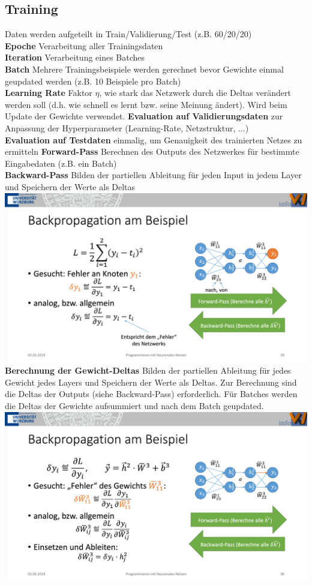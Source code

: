 \documentclass[12pt]{article}
\begin{document}
	\subsection{Training}
	Daten werden aufgeteilt in Train/Validierung/Test (z.B. 60/20/20)\\
	\textbf{Epoche} Verarbeitung aller Trainingsdaten\\
	\textbf{Iteration} Verarbeitung eines Batches\\
	\textbf{Batch} Mehrere Trainingsbeispiele werden gerechnet bevor Gewichte einmal geupdated werden (z.B. 10 Beispiele pro Batch)\\
	\textbf{Learning Rate} Faktor $\eta$, wie stark das Netzwerk durch die Deltas verändert werden soll (d.h. wie schnell es lernt bzw. seine Meinung ändert). Wird beim Update der Gewichte verwendet.
	\textbf{Evaluation auf Validierungsdaten} zur Anpassung der Hyperparameter (Learning-Rate, Netzstruktur, ...)\\
	\textbf{Evaluation auf Testdaten} einmalig, um Genauigkeit des trainierten Netzes zu ermitteln
	\textbf{Forward-Pass} Berechnen des Outputs des Netzwerkes für bestimmte Eingabedaten (z.B. ein Batch)\\
	\textbf{Backward-Pass} Bilden der partiellen Ableitung für jeden Input in jedem Layer und Speichern der Werte als Deltas\\
	\includegraphics[width=\linewidth]{figures/backpropagation.png}\\
	\textbf{Berechnung der Gewicht-Deltas} Bilden der partiellen Ableitung für jedes Gewicht jedes Layers und Speichern der Werte als Deltas. Zur Berechnung sind die Deltas der Outputs (siehe Backward-Pass) erforderlich. Für Batches werden die Deltas der Gewichte aufsummiert und nach dem Batch geupdated.\\
	\includegraphics[width=\linewidth]{figures/calculate-delta-weights.png}\\
\end{document}
